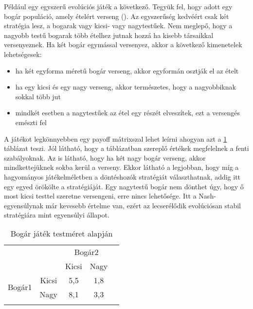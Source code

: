 Például egy egyszerű evolúciós játék a következő. Tegyük fel, hogy adott egy bogár populáció, amely ételért verseng (\cite{book:egt}). Az egyszerűség kedvéért csak két stratégia lesz, a bogarak vagy kicsi- vagy nagytestűek. Nem meglepő, hogy a nagyobb testű bogarak több ételhez jutnak hozzá ha kisebb társaikkal versenyeznek. Ha két bogár egymással versenyez, akkor a következő kimenetelek lehetségesek:
\begin{itemize}[noitemsep]
	\item ha két egyforma méretű bogár verseng, akkor egyformán osztják el az ételt
	\item ha egy kicsi és egy nagy verseng, akkor természetes, hogy a nagyobbiknak sokkal több jut
	\item mindkét esetben a nagytestűek az étel egy részét elveszítek, ezt a versengés emészti fel 
\end{itemize}
A játékot legkönnyebben egy payoff mátrixszal lehet leírni ahogyan azt a \ref{fig:beetle} táblázat teszi. Jól látható, hogy a táblázatban szereplő értékek megfelelnek a fenti szabályoknak. Az is látható, hogy ha két nagy bogár verseng, akkor mindkettejüknek sokba kerül a verseny.
Ekkor látható a legjobban, hogy míg a hagyományos játékelméletben a döntéshozók stratégiát választhatnak, addig itt egy egyed örökölte a stratégiáját. Egy nagytestű bogár nem dönthet úgy, hogy ő most kicsi testtel szeretne versengeni, erre nincs lehetősége. Itt a Nash-egyensúlynak már kevesebb értelme van, ezért az lecserélődik evolúciósan stabil stratégiára mint egyensúlyi állapot.

\begin{table}[htb!]
	\centering
	\begin{tabular}{ccccc}
		&       & \multicolumn{2}{c}{Bogár2} &  \\
		\multicolumn{1}{c}{}    &       & Kicsi        & Nagy        &  \\ \cline{3-4}
		\multirow{2}{*}{Bogár1} & Kicsi & \multicolumn{1}{|c|}{5,5}          & \multicolumn{1}{c|}{1,8}         &  \\ \cline{3-4}
		& Nagy  & \multicolumn{1}{|c|}{8,1}          & \multicolumn{1}{c|}{3,3}         & \\ \cline{3-4} \\
	\end{tabular}
	\caption{Bogár játék testméret alapján}
	\label{fig:beetle}
\end{table}